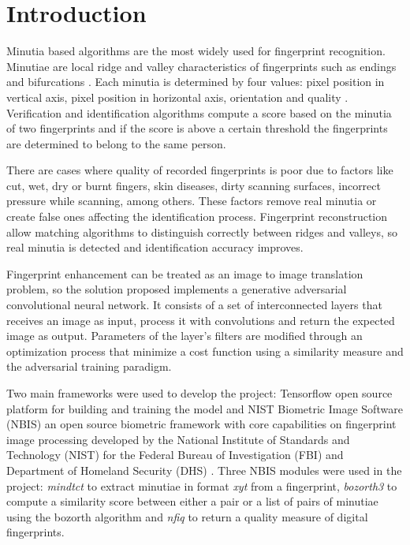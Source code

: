 \documentclass[a4paper,fleqn]{cas-dc}
\begin{document}
\section{Introduction}

Minutia based algorithms are the most widely used for fingerprint recognition. Minutiae are local ridge and valley characteristics of fingerprints such as endings and bifurcations \cite{HFPR}. Each minutia is determined by four values: pixel position in vertical axis, pixel position in horizontal axis, orientation and quality \cite{NBISUG}. Verification and identification algorithms compute a score based on the minutia of two fingerprints and if the score is above a certain threshold the fingerprints are determined to belong to the same person.

There are cases where quality of recorded fingerprints is poor due to factors like cut, wet, dry or burnt fingers, skin diseases, dirty scanning surfaces, incorrect pressure while scanning, among others. These factors remove real minutia or create false ones affecting the identification process. Fingerprint reconstruction allow matching algorithms to distinguish correctly between ridges and valleys, so real minutia is detected and identification accuracy improves.

Fingerprint enhancement can be treated as an image to image translation problem, so the solution proposed implements a generative adversarial convolutional neural network. It consists of a set of interconnected layers that receives an image as input, process it with convolutions and return the expected image as output. Parameters of the layer's filters are modified through an optimization process that minimize a cost function using a similarity measure and the adversarial training paradigm. 

Two main frameworks were used to develop the project: Tensorflow open source platform for building and training the model and NIST Biometric Image Software (NBIS) an open source biometric framework with core capabilities on fingerprint image processing developed by the National Institute of Standards and Technology (NIST) for the Federal Bureau of Investigation (FBI) and Department of Homeland Security (DHS) \cite{NBISWP}. Three NBIS modules were used in the project: \textit{mindtct} to extract minutiae in format \textit{xyt} from a fingerprint, \textit{bozorth3} to compute a similarity score between either a pair or a list of pairs of minutiae using the bozorth algorithm and \textit{nfiq} to return a quality measure of digital fingerprints.
\end{document}
